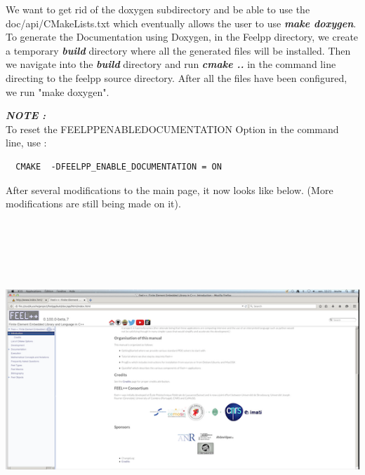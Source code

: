 \documentclass[11pt,utf8]{article}
\begin{document}
We want to get rid of the doxygen subdirectory and be able to use the doc/api/CMakeLists.txt which eventually allows the user to use  \textbf{\textit{make doxygen}}.\\

 To generate the Documentation using Doxygen, in the Feelpp directory, we create a temporary \textbf{\textit{build}} directory where all the generated files will be installed. Then we navigate into the  \textbf{\textit{build}} directory and run  \textbf{\textit{cmake ..}} in the command line directing to the feelpp source directory. 
 After all the files have been configured, we run "make doxygen". 
 
 \textbf{\textit{NOTE :}}\\
 To reset the  FEELPP\textunderscore ENABLE\textunderscore DOCUMENTATION Option in the command line, use :
 
 \begin{center}
 \begin{lstlisting}
  CMAKE  -DFEELPP_ENABLE_DOCUMENTATION = ON
 \end{lstlisting}
 \end{center}
 
 After several modifications to the main page, it now looks like below. (More modifications are still being made on it).
 \begin{center}
 \includegraphics[width=18cm,height=12cm]{img}
 \end{center}
\end{document}
